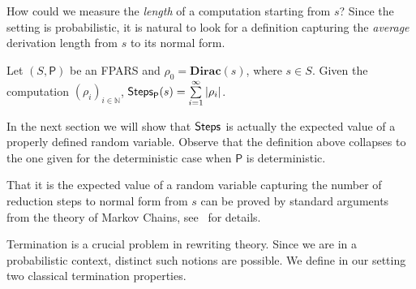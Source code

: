How could we measure the \emph{length} of a computation starting from $s$? Since the setting is probabilistic, it is natural
to look for a definition capturing the \emph{average} derivation length from
$s$ to its normal form. 
\begin{definition}
	Let $(S,\mathsf{P})$ be an FPARS and $\rho_0=\mathbf{Dirac}(s)$,
	where $s\in S$. Given the computation $(\rho_i)_{i\in\mathbb{N}}$,
	$\mathsf{Steps}_{\mathsf{P}}(s)=\sum\limits_{i=1}^{\infty} \left|\rho_i\right|$.
\end{definition}
In the next section we will show that $\mathsf{Steps}_{}$ is actually the expected value of a properly defined random variable. Observe that the definition above collapses to the one given for the
deterministic case when $\mathsf{P}$ is deterministic. 
\begin{SHORT}
	That it is the expected value of a random variable capturing the number of reduction
	steps to normal form from $s$ can be proved by standard arguments
	from the theory of Markov Chains, see~\cite{EV} for details.
\end{SHORT}
Termination is a crucial problem in rewriting theory. Since we are in
a probabilistic context, distinct such notions are
possible. We define in our setting two classical termination
properties.  



